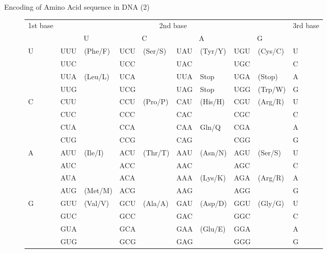 \documentclass[pdf]{beamer}
\begin{document}
\begin{frame}{Encoding of Amino Acid sequence in DNA (2)}
\begin{figure}[ht]
  \tiny
  \renewcommand{\arraystretch}{1.25}
  \begin{tabular}{ |l| l l|l l| l l|l l|l| }
    \hline
    \multirow{2}{2em}{1st base} &
    \multicolumn{8}{|c|}{2nd base} &
    \multirow{2}{2em}{3rd base} \\
    \cline{2-9}
    &
    \multicolumn{2}{|c|}{U} &
    \multicolumn{2}{|c|}{C} &
    \multicolumn{2}{|c|}{A} &
    \multicolumn{2}{|c|}{G} & \\
    \hline
    \multirow{4}{2em}{U} & 
    UUU & \multirow{2}{4em}{\tiny (Phe/F)} &
    UCU & \multirow{4}{4em}{\tiny (Ser/S)} &
    UAU & \multirow{2}{4em}{\tiny (Tyr/Y)} &
    UGU & \multirow{2}{4em}{\tiny (Cys/C)} & U \\
    & UUC & & UCC & & UAC & & UGC & & C \\ \cline{2-3} \cline{6-9}
    & UUA & \multirow{6}{4em}{\tiny (Leu/L)} 
    & UCA & & UUA & Stop & UGA & (Stop) & A \\ \cline{8-9}
    & UUG & & UCG & & UAG & Stop & UGG & \tiny (Trp/W) & G \\ \cline{4-9} 
    \cline{1-1}
    \multirow{4}{2em}{C}
    & CUU & & CCU & \multirow{4}{4em}{(Pro/P)} & CAU & \multirow{2}{4em}{(His/H)} & CGU & \multirow{4}{4em}{(Arg/R)} & U \\
    & CUC & & CCC & & CAC & & CGC & & C \\ \cline{6-7}
    & CUA & & CCA & & CAA & \multirow{2}{4em}{Gln/Q} & CGA & & A \\
    & CUG & & CCG & & CAG & & CGG & & G \\ \cline{1-9}
    \multirow{4}{2em}{A}
    & AUU & \multirow{3}{4em}{(Ile/I)} & ACU & \multirow{4}{4em}{(Thr/T)} & AAU 
    & \multirow{2}{4em}{(Asn/N)} & AGU & \multirow{2}{4em}{(Ser/S)} & U \\
    & AUC & & ACC & & AAC & & AGC & & C \\ \cline{6-9}
    & AUA & & ACA & & AAA & \multirow{2}{4em}{(Lys/K)} & AGA & \multirow{2}{4em}{(Arg/R)} & A \\
    \cline{2-3}
    & AUG & (Met/M) & ACG & & AAG & & AGG & & G \\ \cline{1-9}
    \multirow{4}{4em}{G}
    & GUU & \multirow{4}{4em}{(Val/V)} & GCU & \multirow{4}{4em}{(Ala/A)} 
    & GAU & \multirow{2}{4em}{(Asp/D)} & GGU & \multirow{4}{4em}{(Gly/G)} & U \\
    & GUC & & GCC & & GAC & & GGC & & C \\ \cline{6-7}
    & GUA & & GCA & & GAA & \multirow{2}{4em}{(Glu/E)} & GGA & & A \\
    & GUG & & GCG & & GAG & & GGG & & G \\ \hline
  \end{tabular}
\end{figure}
\end{frame}
\end{document}
